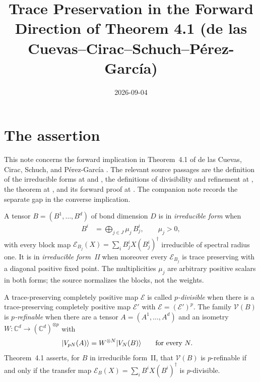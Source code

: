 \documentclass{article}
\title{Trace Preservation in the Forward Direction of Theorem 4.1
  (de las Cuevas--Cirac--Schuch--P\'erez-Garc\'ia)}
\author{}
\date{2026-09-04}
\begin{document}
\maketitle
{}

\section{The assertion}

This note concerns the forward implication in Theorem~4.1 of de las Cuevas,
Cirac, Schuch, and P\'erez-Garc\'ia
\cite[Theorem~4.1]{DeLasCuevas2017Irreducible}. The relevant source passages
are the definition of the irreducible forms at
 and
, the definitions of divisibility
and refinement at , the theorem at
, and its forward proof at
. The companion note
 records the separate gap in the
converse implication.

A tensor $B=(B^1,\ldots,B^d)$ of bond dimension $D$ is in
\emph{irreducible form} when
\begin{align}
    B^i
     & =\bigoplus_{j\in J}\mu_j\,B_j^i,
    \qquad \mu_j>0,
    \label{eq:dccsp17_thm41_forward_trace_preservation_irreducible_form}
\end{align}
with every block map $\mathcal E_{B_j}(X)=\sum_i B_j^iX(B_j^i)^\dagger$
irreducible of spectral radius one. It is in \emph{irreducible form~II} when
moreover every $\mathcal E_{B_j}$ is trace preserving with a diagonal
positive fixed point. The multiplicities $\mu_j$ are arbitrary positive
scalars in both forms; the source normalizes the blocks, not the weights.

A trace-preserving completely positive map $\mathcal E$ is called
\emph{$p$-divisible} when there is a trace-preserving completely positive map
$\mathcal E'$ with $\mathcal E=(\mathcal E')^p$. The family $\mathcal V(B)$
is \emph{$p$-refinable} when there are a tensor $A=(A^1,\ldots,A^d)$ and an
isometry $W:\mathbb C^d\to(\mathbb C^d)^{\otimes p}$ with
\begin{align}
    |V_{pN}(A)\rangle
     & =W^{\otimes N}|V_N(B)\rangle
    \qquad\text{for every }N.
    \label{eq:dccsp17_thm41_forward_trace_preservation_refinement}
\end{align}
Theorem~4.1 asserts, for $B$ in irreducible form~II, that $\mathcal V(B)$ is
$p$-refinable if and only if the transfer map
$\mathcal E_B(X)=\sum_i B^iX(B^i)^\dagger$ is $p$-divisible.
\end{document}
